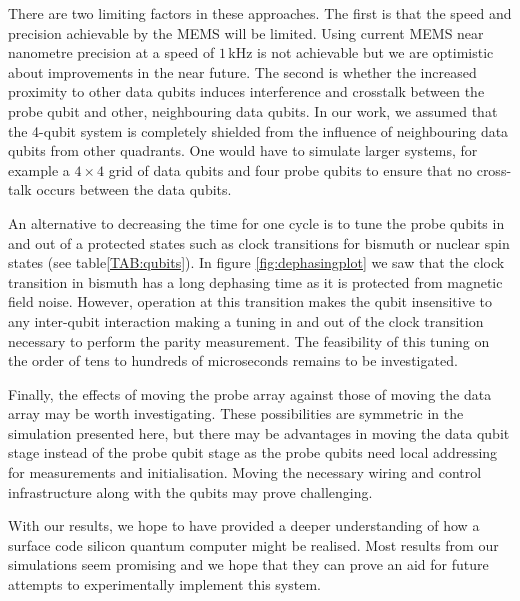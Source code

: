 There are two limiting factors in these approaches. The first is that the speed and precision achievable by the MEMS will be limited. Using current MEMS near nanometre precision at a speed of $1\, $kHz \cite{Koo2012,Chu2003} is not achievable but we are optimistic about improvements in the near future. The second is whether the increased proximity to other data qubits induces interference and crosstalk between the probe qubit and other, neighbouring data qubits. In our work, we assumed that the 4-qubit system is completely shielded from the influence of neighbouring data qubits from other quadrants. One would have to simulate larger systems, for example a $4\times 4$ grid of data qubits and four probe qubits to ensure that no cross-talk occurs between the data qubits. 

An alternative to decreasing the time for one cycle is to tune the probe qubits in and out of a protected states such as clock transitions for bismuth or nuclear spin states (see table\@ \ref{TAB:qubits}). In figure \ref{fig:dephasingplot} we saw that the clock transition in bismuth has a long dephasing time as it is protected from magnetic field noise. However, operation at this transition makes the qubit insensitive to any inter-qubit interaction making a tuning in and out of the clock transition necessary to perform the parity measurement. The feasibility of this tuning on the order of tens to hundreds of microseconds remains to be investigated.

Finally, the effects of moving the probe array against those of moving the data array may be worth investigating. These possibilities are symmetric in the simulation presented here, but there may be advantages in moving the data qubit stage instead of the probe qubit stage as the probe qubits need local addressing for measurements and initialisation. Moving the necessary wiring and control infrastructure along with the qubits may prove challenging.

With our results, we hope to have provided a deeper understanding of how a surface code silicon quantum computer might be realised. Most results from our simulations seem promising and we hope that they can prove an aid for future attempts to experimentally implement this system. 














